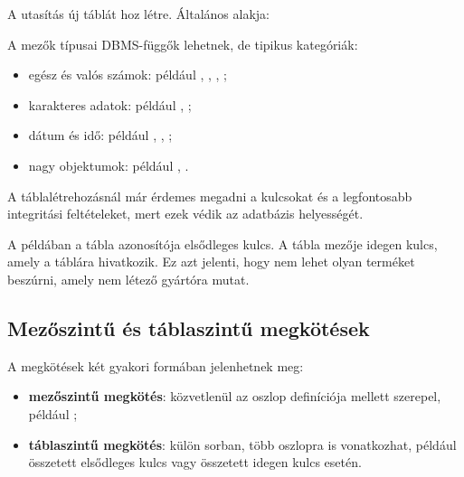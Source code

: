 A  utasítás új táblát hoz létre. Általános alakja:

\begin{center}
\end{center}

A mezők típusai DBMS-függők lehetnek, de tipikus kategóriák:

\begin{itemize}
  \item egész és valós számok: például , , , ;
  \item karakteres adatok: például , ;
  \item dátum és idő: például , , ;
  \item nagy objektumok: például , .
\end{itemize}

A táblalétrehozásnál már érdemes megadni a kulcsokat és a legfontosabb integritási feltételeket, mert ezek védik az adatbázis helyességét.

\begin{center}

\end{center}


A példában a  tábla azonosítója elsődleges kulcs. A  tábla  mezője idegen kulcs, amely a  táblára hivatkozik. Ez azt jelenti, hogy nem lehet olyan terméket beszúrni, amely nem létező gyártóra mutat.

\subsection{Mezőszintű és táblaszintű megkötések}

A megkötések két gyakori formában jelenhetnek meg:

\begin{itemize}
  \item \textbf{mezőszintű megkötés}: közvetlenül az oszlop definíciója mellett szerepel, például ;
  \item \textbf{táblaszintű megkötés}: külön sorban, több oszlopra is vonatkozhat, például összetett elsődleges kulcs vagy összetett idegen kulcs esetén.
\end{itemize}

